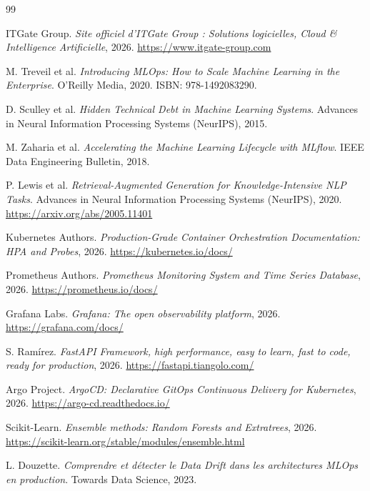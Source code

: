 \documentclass[11pt,a4paper,oneside]{report}
\begin{document}
\begin{thebibliography}{99}

 ITGate Group. \emph{Site officiel d'ITGate Group : Solutions logicielles, Cloud \& Intelligence Artificielle}, 2026. \url{https://www.itgate-group.com}

 M. Treveil et al. \emph{Introducing MLOps: How to Scale Machine Learning in the Enterprise}. O'Reilly Media, 2020. ISBN: 978-1492083290.

 D. Sculley et al. \emph{Hidden Technical Debt in Machine Learning Systems}. Advances in Neural Information Processing Systems (NeurIPS), 2015.

 M. Zaharia et al. \emph{Accelerating the Machine Learning Lifecycle with MLflow}. IEEE Data Engineering Bulletin, 2018.

 P. Lewis et al. \emph{Retrieval-Augmented Generation for Knowledge-Intensive NLP Tasks}. Advances in Neural Information Processing Systems (NeurIPS), 2020. \url{https://arxiv.org/abs/2005.11401}

 Kubernetes Authors. \emph{Production-Grade Container Orchestration Documentation: HPA and Probes}, 2026. \url{https://kubernetes.io/docs/}

 Prometheus Authors. \emph{Prometheus Monitoring System and Time Series Database}, 2026. \url{https://prometheus.io/docs/}

 Grafana Labs. \emph{Grafana: The open observability platform}, 2026. \url{https://grafana.com/docs/}

 S. Ramírez. \emph{FastAPI Framework, high performance, easy to learn, fast to code, ready for production}, 2026. \url{https://fastapi.tiangolo.com/}

 Argo Project. \emph{ArgoCD: Declarative GitOps Continuous Delivery for Kubernetes}, 2026. \url{https://argo-cd.readthedocs.io/}

 Scikit-Learn. \emph{Ensemble methods: Random Forests and Extratrees}, 2026. \url{https://scikit-learn.org/stable/modules/ensemble.html}

 L. Douzette. \emph{Comprendre et détecter le Data Drift dans les architectures MLOps en production}. Towards Data Science, 2023.

\end{thebibliography}
\end{document}
